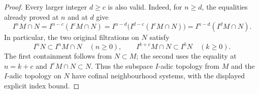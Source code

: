 \begin{proof}
Every larger integer $d\geq c$ is also valid. Indeed, for $n\geq d$,
the equalities already proved at $n$ and at $d$ give
$$
I^nM\cap N=I^{n-c}(I^cM\cap N)
=I^{n-d}\bigl(I^{d-c}(I^cM\cap N)\bigr)
=I^{n-d}(I^dM\cap N).
$$
In particular, the two original filtrations on $N$ satisfy
$$
I^nN\subset I^nM\cap N\quad(n\geq0),\qquad
I^{k+c}M\cap N\subset I^kN\quad(k\geq0).
$$
The first containment follows from $N\subset M$; the second
uses the equality at $n=k+c$ and $I^cM\cap N\subset N$.
Thus the subspace $I$-adic topology from $M$ and the $I$-adic
topology on $N$ have cofinal neighbourhood systems, with the
displayed explicit index bound.
\end{proof}